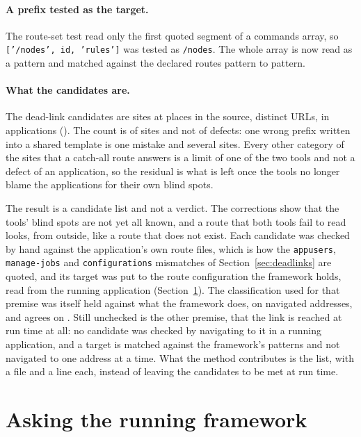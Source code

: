 \paragraph{A prefix tested as the target.} The route-set test read only the first quoted segment of a commands array, so \texttt{['/nodes', id, 'rules']} was tested as \texttt{/nodes}. The whole array is now read as a pattern and matched against the declared routes pattern to pattern.

\paragraph{What the candidates are.} The dead-link candidates are \RoundTwoDeadLinkCandidates{} sites at \RoundTwoDeadLinkLocations{} places in the source, \RoundTwoDeadLinkUrls{} distinct URLs, in \RoundTwoDeadLinkApps{} applications (\RoundTwoDeadLinkWhere{}). The count is of sites and not of defects: one wrong prefix written into a shared template is one mistake and several sites. Every other category of the \RoundTwoWildcardRescued{} sites that a catch-all route answers is a limit of one of the two tools and not a defect of an application, so the residual is what is left once the tools no longer blame the applications for their own blind spots.

The result is a candidate list and not a verdict. The corrections show that the tools' blind spots are not yet all known, and a route that both tools fail to read looks, from outside, like a route that does not exist. Each candidate was checked by hand against the application's own route files, which is how the \texttt{appusers}, \texttt{manage-jobs} and \texttt{configurations} mismatches of Section~\ref{sec:deadlinks} are quoted, and its target was put to the route configuration the framework holds, read from the running application (Section~\ref{sec:res-probe}). The classification used for that premise was itself held against what the framework does, on \ProbeAnswerChecked{} navigated addresses, and agrees on \ProbeAnswerAgreed{}. Still unchecked is the other premise, that the link is reached at run time at all: no candidate was checked by navigating to it in a running application, and a target is matched against the framework's patterns and not navigated to one address at a time. What the method contributes is the list, with a file and a line each, instead of leaving the candidates to be met at run time.

\section{Asking the running framework}
\label{sec:res-probe}

